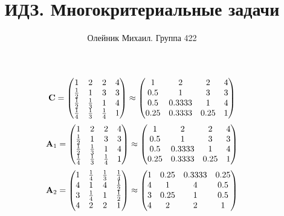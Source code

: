 \documentclass[10pt,a4paper]{article}
\title{ИДЗ. Многокритериальные задачи}
\author{Олейник Михаил. Группа 422}
\begin{document}
	\maketitle
	
	\[
		\bold{C} = 
		\begin{pmatrix}
			{1} {} & {{2}} {} & {{2}} {} & {{4}} {} \\
			\frac{1} {{2}} & {1} {} & {{3}} {} & {{3}} {} \\
			\frac{1} {{2}} & \frac{1} {{3}} & {1} {} & {{4}} {} \\
			\frac{1} {{4}} & \frac{1} {{3}} & \frac{1} {{4}} & {1} {} \\
		\end{pmatrix}
		\approx
		\begin{pmatrix}
			1        & 2        & 2        & 4        \\
			0.5      & 1        & 3        & 3        \\
			0.5      & 0.3333   & 1        & 4        \\
			0.25     & 0.3333   & 0.25     & 1        \\
		\end{pmatrix}
	\]
	\[
		\bold{A}_{1} = 
		\begin{pmatrix}
			{1} {} & {{2}} {} & {{2}} {} & {{4}} {} \\
			\frac{1} {{2}} & {1} {} & {{3}} {} & {{3}} {} \\
			\frac{1} {{2}} & \frac{1} {{3}} & {1} {} & {{4}} {} \\
			\frac{1} {{4}} & \frac{1} {{3}} & \frac{1} {{4}} & {1} {} \\
		\end{pmatrix}
		\approx
		\begin{pmatrix}
			1        & 2        & 2        & 4        \\
			0.5      & 1        & 3        & 3        \\
			0.5      & 0.3333   & 1        & 4        \\
			0.25     & 0.3333   & 0.25     & 1        \\
		\end{pmatrix}
	\]
	\[
		\bold{A}_{2} = 
		\begin{pmatrix}
			{1} {} & \frac{1} {{4}} & \frac{1} {{3}} & \frac{1} {{4}} \\
			{{4}} {} & {1} {} & {{4}} {} & \frac{1} {{2}} \\
			{{3}} {} & \frac{1} {{4}} & {1} {} & \frac{1} {{2}} \\
			{{4}} {} & {{2}} {} & {{2}} {} & {1} {} \\
		\end{pmatrix}
		\approx
		\begin{pmatrix}
			1        & 0.25     & 0.3333   & 0.25     \\
			4        & 1        & 4        & 0.5      \\
			3        & 0.25     & 1        & 0.5      \\
			4        & 2        & 2        & 1        \\
		\end{pmatrix}
	\]
\end{document}

